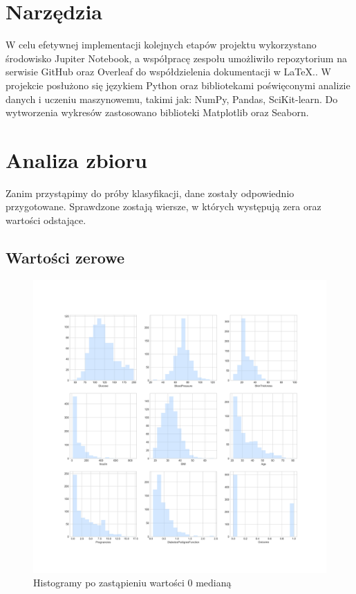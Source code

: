 \documentclass[12pt]{article}
\begin{document}
\section{Narzędzia}
W celu efetywnej implementacji kolejnych etapów projektu wykorzystano środowisko Jupiter Notebook, a współpracę zespołu umożliwiło repozytorium na serwisie GitHub oraz Overleaf do współdzielenia dokumentacji w \LaTeX.. W projekcie posłużono się językiem Python oraz bibliotekami poświęconymi analizie danych i uczeniu maszynowemu, takimi jak: NumPy, Pandas, SciKit-learn. Do wytworzenia wykresów zastosowano biblioteki Matplotlib oraz Seaborn. 

\section{Analiza zbioru}

Zanim przystąpimy do próby klasyfikacji, dane zostały odpowiednio przygotowane. Sprawdzone zostają wiersze, w których występują zera oraz wartości odstające.

\subsection{Wartości zerowe}

\begin{figure}
	\begin{adjustwidth}{-3.3cm}{}
		\centering
		\includegraphics[width=1.5\textwidth]{images/histograms_median.jpg}
		\caption{Histogramy po zastąpieniu wartości 0 medianą}
		\label{fig:outliers}
	\end{adjustwidth}
\end{figure}
\end{document}
